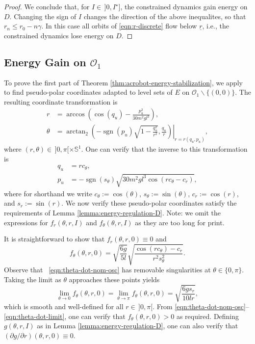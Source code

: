 \documentclass[journal,twoside,web, twocolumn,draftcls]{ieeecolor}
\DeclareMathOperator{\Sign}{sgn}
\newcommand*{\sign}[1]{\Sign\left(#1\right)}
\newcommand*{\Sone}{\mathbb{S}^1}
\begin{document}
\begin{proof}
    We conclude that, for \(I \in \, ]0, I^\star]\), the constrained dynamics gain
    energy on \(D\).
    Changing the sign of \(I\) changes the direction of the
    above inequalites, so that \(r_{n} \leq r_0 - n\gamma\). 
    In this case all orbits of \eqref{eqn:r-discrete} flow below
    \(\underline{r}\), i.e., the constrained dynamics lose energy on \(D\).
\end{proof}

\subsection{Energy Gain on \(\mathcal{O}_1\)}\label{sec:proof-o1}
To prove the first part of Theorem
\ref{thm:acrobot-energy-stabilization}, we apply
\cite[Eqn. (9)]{dynamic_vhcs_stabilize_closed_orbits} to find 
pseudo-polar coordinates adapted to level sets of \(E\) on
\(\mathcal{O}_1 \backslash \{(0,0)\}\).
The resulting coordinate transformation is
\begin{align}
    \label{eqn:r-osc}
    r &= \arccos\left(\cos(q_u) - \frac{p_u^2}{30m^2gl^3}\right)
    , \\
    \label{eqn:theta-osc}
    \theta &=
    \left.\arctan_2\left(-\sign{p_u}\sqrt{1-\frac{q_u^2}{r^2}},\frac{q_u}{r}\right)
    \right|_{r = r(q_u,p_u)}
    ,
\end{align}
where \((r,\theta) \in \, ]0,\pi[ \times \Sone\).
One can verify that the inverse to this transformation is
\begin{align*}
    q_u &= rc_\theta
    , \\
    p_u &= -\sign{s_\theta}
    \sqrt{30m^2gl^3\cos(rc_\theta - c_r)}
    ,
\end{align*}
where for shorthand we write \(c_\theta := \cos(\theta)\), \(s_\theta :=
\sin(\theta)\), \(c_r := \cos(r)\), and \(s_r := \sin(r)\).
We now verify these pseudo-polar coordinates satisfy the requirements of 
Lemma \ref{lemma:energy-regulation-D}.
Note: we omit the expressions for \(f_r(\theta,r,I)\) and
\(f_\theta(\theta,r,I)\) as they are too long for print.

It is straightforward to show that
\(f_r(\theta,r,0) \equiv 0\)
and
\begin{equation} \label{eqn:theta-dot-nom-osc}
    f_\theta(\theta,r,0) = \sqrt{\frac{6g}{5l}} 
        \sqrt{\frac{\cos(r c_\theta) - c_r}
            {r^2 s_\theta^2}}
    .
\end{equation}
Observe that ~\eqref{eqn:theta-dot-nom-osc} has removable singularities at
\(\theta \in \{0,\pi\}\).
Taking the limit as \(\theta\) approaches these points yields
\begin{equation}\label{eqn:theta-dot-limit}
    \lim\limits_{\theta \to 0}f_\theta(\theta,r,0)
    = \lim\limits_{\theta \to \pi} f_\theta(\theta,r,0)
    = \sqrt{\frac{6g s_r}{10lr}}
    , 
\end{equation}
which is smooth and well-defined for all
\(r \in \, ]0,\pi[\).
From \eqref{eqn:theta-dot-nom-osc}--\eqref{eqn:theta-dot-limit},
one can verify that \(f_\theta(\theta,r,0) > 0\) as required.
Defining \(g(\theta,r,I)\) as in Lemma \ref{lemma:energy-regulation-D}, one can
also verify that \((\partial g/\partial r)(\theta,r,0) \equiv 0\).
\end{document}

